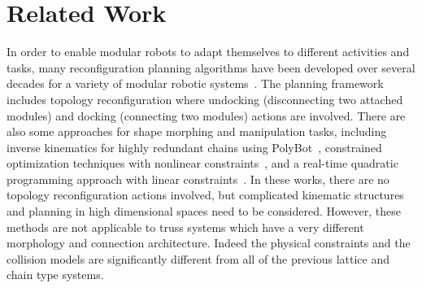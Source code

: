 \documentclass[journal]{IEEEtran}
\begin{document}
\section{Related Work}
\label{sec:related-work}

In order to enable modular robots to adapt themselves to different
activities and tasks, many reconfiguration planning algorithms have
been developed over several decades for a variety of modular robotic
systems~\cite{Yim-reconfiguration-chain-1999,
  Butler-decentralized-control-ijrr-2004,
  Hou-graph-reconfiguration-ras-2014, Liu-smores-reconfig-ral-2019}.
The planning framework includes topology reconfiguration where
undocking (disconnecting two attached modules) and docking (connecting
two modules) actions are involved. There are also some approaches for
shape morphing and manipulation tasks, including inverse kinematics
for highly redundant chains using
PolyBot~\cite{Yim-joint-solution-redundant-icra-2001}, constrained
optimization techniques with nonlinear
constraints~\cite{Fromherz-modular-robot-control-2001}, and a
real-time quadratic programming approach with linear
constraints~\cite{Liu-manipulation-ijrc-2021}. In these works, there
are no topology reconfiguration actions involved, but complicated
kinematic structures and planning in high dimensional spaces need to
be considered. However, these methods are not applicable to truss
systems which have a very different morphology and connection
architecture. Indeed the physical constraints and the collision models
are significantly different from all of the previous lattice and chain
type systems.
\end{document}
